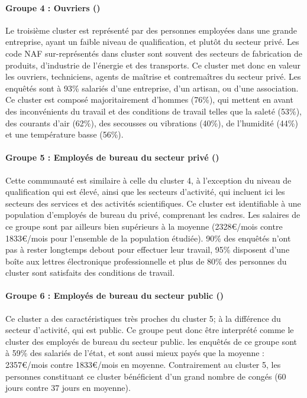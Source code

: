 \documentclass[11pt,fleqn,a4paper,openany,frenchb]{book} %
\begin{document}
\paragraph{Groupe 4 : Ouvriers (\OUVR)\\}
Le troisième cluster est représenté par des personnes employées dans une grande entreprise, ayant un faible niveau de qualification, et plutôt du secteur privé. Les code NAF sur-représentés dans cluster sont souvent des secteurs de fabrication de produits, d'industrie de l'énergie et des transports. Ce cluster met donc en valeur les ouvriers, techniciens, agents de maîtrise et contremaîtres du secteur privé. Les enquêtés sont à 93\% salariés d'une entreprise, d'un artisan, ou d'une association. Ce cluster est composé majoritairement d'hommes (76\%), qui mettent en avant des inconvénients du travail et des conditions de travail telles que la saleté (53\%), des courants d'air (62\%), des secousses ou vibrations (40\%), de l'humidité (44\%) et une température basse (56\%). 

\paragraph{Groupe 5 : Employés de bureau du secteur privé (\CSPPPr)\\}
Cette communauté est similaire à celle du cluster 4, à l'exception du niveau de qualification qui est élevé, ainsi que les secteurs d'activité, qui incluent ici les secteurs des services et des activités scientifiques. Ce cluster est identifiable à une population d'employés de bureau du privé, comprenant les cadres. Les salaires de ce groupe sont par ailleurs bien supérieurs à la moyenne (2328\euro{}/mois contre 1833\euro{}/mois pour l'ensemble de la population étudiée). 90\% des enquêtés n'ont pas à rester longtemps debout pour effectuer leur travail, 95\% disposent d'une boîte aux lettres électronique professionnelle et plus de 80\% des personnes du cluster sont satisfaits des conditions de travail.

\paragraph{Groupe 6 : Employés de bureau du secteur public (\CSPPPu)\\}
Ce cluster a des caractéristiques très proches du cluster 5; à la différence du secteur d'activité, qui est public. Ce groupe peut donc être interprété comme le cluster des employés de bureau du secteur public. les enquêtés de ce groupe sont à 59\% des salariés de l'état, et sont aussi mieux payés que la moyenne : 2357\euro{}/mois contre 1833\euro{}/mois en moyenne. Contrairement au cluster 5, les personnes constituant ce cluster bénéficient d'un grand nombre de congés (60 jours contre 37 jours en moyenne).
\end{document}
